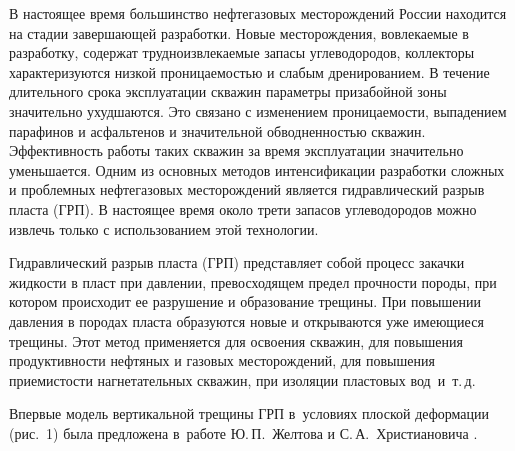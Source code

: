 





\date{19/IV/2010}


\maketitle

 В настоящее время большинство нефтегазовых месторождений России находится на стадии завершающей разработки.
Новые месторождения, вовлекаемые в разработку, содержат трудноизвлекаемые запасы углеводородов, коллекторы характеризуются низкой
проницаемостью и слабым дренированием. В течение длительного срока эксплуатации скважин параметры призабойной зоны значительно
ухудшаются. Это связано с изменением проницаемости, выпадением парафинов и асфальтенов и значительной обводненностью скважин.
Эффективность работы таких скважин за время эксплуатации значительно уменьшается. Одним из основных методов интенсификации
разработки сложных и проблемных нефтегазовых месторождений является гидравлический разрыв пласта (ГРП). В настоящее время около
трети запасов углеводородов можно извлечь только с использованием этой технологии.

Гидравлический разрыв пласта (ГРП) представляет собой процесс закачки жидкости в пласт при давлении, превосходящем предел
прочности породы, при котором происходит ее разрушение и образование трещины. При повышении давления в породах пласта образуются
новые и открываются уже имеющиеся трещины. Этот метод применяется для освоения скважин, для повышения продуктивности нефтяных и
газовых месторождений, для повышения приемистости нагнетательных скважин, при изоляции пластовых вод~и~т.\,д.

\smallskip

 Впервые модель вертикальной трещины ГРП в~условиях плоской деформации (рис.~1) была
предложена в~работе Ю.\,П.~Желтова и С.\,А.~Христиановича \cite{vlast10:1}.

